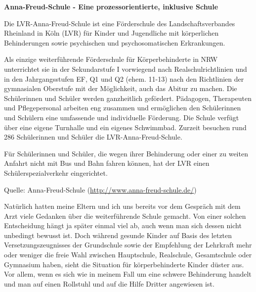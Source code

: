 \documentclass[fontsize=14pt,a4paper,headinclude,DIV=calc,automark]{scrbook}
\begin{document}
\begin{tcolorbox}[
    enhanced,
    breakable,
    colframe=rahmenlinie,      %
    colback=white,             %
    left=12pt, right=12pt,     %
    top=12pt, bottom=12pt,     %
    boxrule=0.3pt,             %
    arc=8pt                    %
]
\small\sffamily
\setlength{\parindent}{0pt} %

\textbf{Anna-Freud-Schule - Eine prozessorientierte, inklusive Schule}

\vspace{0.5\baselineskip}

Die LVR-Anna-Freud-Schule ist eine Förderschule des Landschaftsverbandes Rheinland in Köln (LVR) für Kinder und Jugendliche mit körperlichen Behinderungen sowie psychischen und psychosomatischen Erkrankungen.

\vspace{0.5\baselineskip}

Als einzige weiterführende Förderschule für Körperbehinderte in NRW unterrichtet sie in der Sekundarstufe I vorwiegend nach Realschulrichtlinien und in den Jahrgangsstufen EF, Q1 und Q2 (ehem. 11-13) nach den Richtlinien der gymnasialen Oberstufe mit der Möglichkeit, auch das Abitur zu machen. Die Schülerinnen und Schüler werden ganzheitlich gefördert. Pädagogen, Therapeuten und Pflegepersonal arbeiten eng zusammen und ermöglichen den Schülerinnen und Schülern eine umfassende und individuelle Förderung. Die Schule verfügt über eine eigene Turnhalle und ein eigenes Schwimmbad. Zurzeit besuchen rund 286 Schülerinnen und Schüler die LVR-Anna-Freud-Schule.

\vspace{0.5\baselineskip}

Für Schülerinnen und Schüler, die wegen ihrer Behinderung oder einer zu weiten Anfahrt nicht mit Bus und Bahn fahren können, hat der LVR einen Schülerspezialverkehr eingerichtet.

{\footnotesize Quelle: Anna-Freud-Schule (\url{http://www.anna-freud-schule.de/})}

\end{tcolorbox}

\vspace{0.8\baselineskip}

Natürlich hatten meine Eltern und ich uns bereits vor dem Gespräch mit dem Arzt viele Gedanken über die weiterführende Schule gemacht. Von einer solchen Entscheidung hängt ja später einmal viel ab, auch wenn man sich dessen nicht unbedingt bewusst ist. Doch während gesunde Kinder auf Basis des letzten Versetzungszeugnisses der Grundschule sowie der Empfehlung der Lehrkraft mehr oder weniger die freie Wahl zwischen Hauptschule, Realschule, Gesamtschule oder Gymnasium haben, sieht die Situation für körperbehinderte Kinder düster aus. Vor allem, wenn es sich wie in meinem Fall um eine schwere Behinderung handelt und man auf einen Rollstuhl und auf die Hilfe Dritter angewiesen ist.
\end{document}
